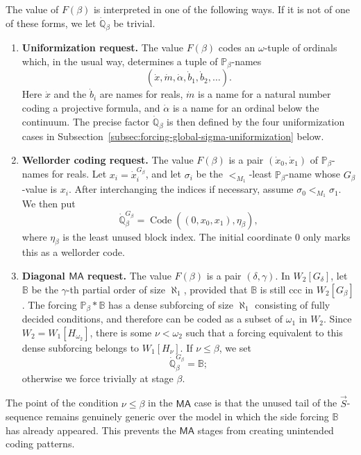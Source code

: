 \documentclass[a4paper,11pt]{article}
\newcommand{\forceP}{\mathbb{P}}
\newcommand{\forceQ}{\mathbb{Q}}
\begin{document}
The value of $F(\beta)$ is interpreted in one of the following ways.  If it is not of one of these forms, we let $\dot{\forceQ}_\beta$ be trivial.

\begin{enumerate}
\item[\textup{(U)}] \textbf{Uniformization request.}  The value $F(\beta)$ codes an $\omega$-tuple of ordinals which, in the usual way, determines a tuple of $\forceP_\beta$-names
\[
(\dot x,\dot m,\dot\alpha,\dot b_1,\dot b_2,\ldots).
\]
Here $\dot x$ and the $\dot b_i$ are names for reals, $\dot m$ is a name for a natural number coding a projective formula, and $\dot\alpha$ is a name for an ordinal below the continuum.  The precise factor $\dot{\forceQ}_\beta$ is then defined by the four uniformization cases in Subsection~\ref{subsec:forcing-global-sigma-uniformization} below.

\item[\textup{(W)}] \textbf{Wellorder coding request.}  The value $F(\beta)$ is a pair $(\dot x_0,
\dot x_1)$ of $\forceP_\beta$-names for reals.  Let $x_i=\dot x_i^{G_\beta}$, and let $\sigma_i$ be the $<_{M_1}$-least $\forceP_\beta$-name whose $G_\beta$-value is $x_i$.  After interchanging the indices if necessary, assume $\sigma_0<_{M_1}\sigma_1$.  We then put
\[
\dot{\forceQ}_\beta^{G_\beta}=\operatorname{Code}((0,x_0,x_1),\eta_\beta),
\]
where $\eta_\beta$ is the least unused block index.  The initial coordinate $0$ only marks this as a wellorder code.

\item[\textup{(M)}] \textbf{Diagonal $\mathsf{MA}$ request.}  The value $F(\beta)$ is a pair $(\delta,\gamma)$.  In $W_2[G_\delta]$, let $\mathbb B$ be the $\gamma$-th partial order of size $\aleph_1$, provided that $\mathbb B$ is still ccc in $W_2[G_\beta]$.  The forcing $\forceP_\beta\ast\mathbb B$ has a dense subforcing of size $\aleph_1$ consisting of fully decided conditions, and therefore can be coded as a subset of $\omega_1$ in $W_2$.  Since $W_2=W_1[H_{\omega_2}]$, there is some $\nu<\omega_2$ such that a forcing equivalent to this dense subforcing belongs to $W_1[H_\nu]$.  If $\nu\leq\beta$, we set
\[
\dot{\forceQ}_\beta^{G_\beta}=\mathbb B;
\]
otherwise we force trivially at stage $\beta$.
\end{enumerate}

The point of the condition $\nu\leq\beta$ in the $\mathsf{MA}$ case is that the unused tail of the $\vec S$-sequence remains genuinely generic over the model in which the side forcing $\mathbb B$ has already appeared.  This prevents the $\mathsf{MA}$ stages from creating unintended coding patterns.
\end{document}
